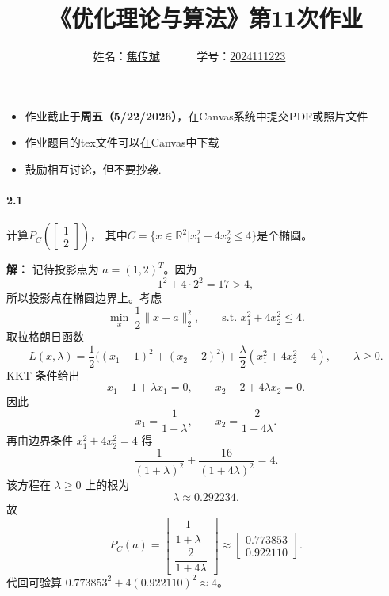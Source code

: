 \documentclass[12pt,a4paper]{article}
\begin{document}
\title{
{《优化理论与算法》第11次作业
}
}
\date{}

\author{
姓名：\underline{焦传斌}~~~~~~
学号：\underline{2024111223}~~~~~~}

\maketitle
\begin{itemize}
	\item 作业截止于{\bf 周五（5/22/2026）}，在Canvas系统中提交PDF或照片文件
	\item 作业题目的tex文件可以在Canvas中下载
	\item 鼓励相互讨论，但不要抄袭.
\end{itemize}

\paragraph{2.1} 计算$P_C\left(\begin{bmatrix}
1 \\
2
\end{bmatrix}\right)$， 其中$C=\{x \in \mathbb{R}^2|x_1^2+4x_2^2 \leq 4 \}$是个椭圆。

\textbf{解：}
记待投影点为 $a=(1,2)^T$。因为
\[
  1^2+4\cdot 2^2=17>4,
\]
所以投影点在椭圆边界上。考虑
\[
  \min_x\ \frac12\|x-a\|_2^2,
  \qquad
  \text{s.t. } x_1^2+4x_2^2\leq 4.
\]
取拉格朗日函数
\[
  L(x,\lambda)
  =\frac12\bigl((x_1-1)^2+(x_2-2)^2\bigr)
  +\frac{\lambda}{2}(x_1^2+4x_2^2-4),
  \qquad \lambda\geq 0.
\]
KKT 条件给出
\[
  x_1-1+\lambda x_1=0,
  \qquad
  x_2-2+4\lambda x_2=0.
\]
因此
\[
  x_1=\frac{1}{1+\lambda},
  \qquad
  x_2=\frac{2}{1+4\lambda}.
\]
再由边界条件 $x_1^2+4x_2^2=4$ 得
\[
  \frac{1}{(1+\lambda)^2}
  +\frac{16}{(1+4\lambda)^2}=4.
\]
该方程在 $\lambda\geq0$ 上的根为
\[
  \lambda\approx 0.292234.
\]
故
\[
  P_C(a)
  =
  \begin{bmatrix}
    \dfrac{1}{1+\lambda}\\[4pt]
    \dfrac{2}{1+4\lambda}
  \end{bmatrix}
  \approx
  \begin{bmatrix}
    0.773853\\
    0.922110
  \end{bmatrix}.
\]
代回可验算 $0.773853^2+4(0.922110)^2\approx4$。
\end{document}
